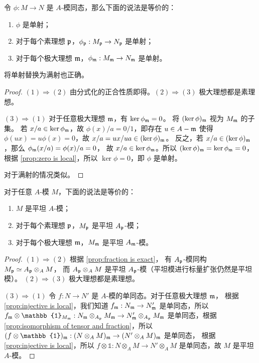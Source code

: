 \begin{proposition}\label{prop:injective is local}
  令 $\phi:M\to N$ 是 $A$-模同态，那么下面的说法是等价的：
  \begin{enumerate}
    \item $\phi$ 是单射；
    \item 对于每个素理想 $\mathfrak{p}$，$\phi_{\mathfrak{p}}:M_{\mathfrak{p}}\to N_{\mathfrak{p}}$ 是单射；
    \item 对于每个极大理想 $\mathfrak{m}$，$\phi_{\mathfrak{m}}:M_{\mathfrak{m}}\to N_{\mathfrak{m}}$ 是单射。
  \end{enumerate}
  将单射替换为满射也正确。
\end{proposition}
\begin{proof}
  $(1)\Rightarrow (2)$ 由分式化的正合性质即得。$(2)\Rightarrow (3)$
  极大理想都是素理想。

  $(3)\Rightarrow (1)$ 对于任意极大理想 $\mathfrak{m}$，有 $\ker\phi_{\mathfrak{m}}=0$。
  将 $(\ker\phi)_{\mathfrak{m}}$ 视为 $M_{\mathfrak{m}}$ 的子集。
  若 $x/a\in \ker\phi_{\mathfrak{m}}$，故 $\phi(x)/a=0/1$，即存在 $u\in A-\mathfrak{m}$
  使得 $\phi(ux)=u\phi(x)=0$，故 $x/a=ux/ua\in (\ker\phi)_{\mathfrak{m}}$。
  反之，若 $x/a\in(\ker\phi)_{\mathfrak{m}}$，那么 $\phi_{\mathfrak{m}}(x/a)=\phi(x)/a=0$，
  故 $x/a\in \ker\phi_{\mathfrak{m}}$。所以 $(\ker\phi)_{\mathfrak{m}}=\ker\phi_{\mathfrak{m}}=0$，
  根据 \autoref{prop:zero is local}，所以 $\ker\phi=0$，即 $\phi$ 是单射。

  对于满射的情况类似。
\end{proof}

\begin{proposition}[平坦性是局部性质]
  对于任意 $A$-模 $M$，下面的说法是等价的：
  \begin{enumerate}
    \item $M$ 是平坦 $A$-模；
    \item 对于每个素理想 $\mathfrak{p}$，$M_{\mathfrak{p}}$ 是平坦 $A_{\mathfrak{p}}$-模；
    \item 对于每个极大理想 $\mathfrak{m}$，$M_{\mathfrak{m}}$ 是平坦 $A_{\mathfrak{m}}$-模。
  \end{enumerate}
\end{proposition}
\begin{proof}
  $(1)\Rightarrow (2)$ 根据 \autoref{prop:fraction is exact}，
  有 $A_{\mathfrak{p}}$-模同构 $M_{\mathfrak{p}}\simeq A_{\mathfrak{p}}\otimes_AM$，
  而 $A_{\mathfrak{p}}\otimes_AM$ 是平坦 $A_{\mathfrak{p}}$-模（平坦模进行标量扩张仍然是平坦模）。
  $(2)\Rightarrow (3)$ 极大理想都是素理想。

  $(3)\Rightarrow (1)$ 令 $f:N\to N'$ 是 $A$-模的单同态。对于任意极大理想 $\mathfrak{m}$，
  根据 \autoref{prop:injective is local}，我们知道 $f_{\mathfrak{m}}:N_{\mathfrak{m}}\to N'_{\mathfrak{m}}$
  是单同态，所以 $f_{\ideal m}\otimes\mathbb{1}_{M_{\ideal m}}:
  N_{\ideal m}\otimes_{A_{\ideal p}}M_{\ideal m}\to N'_{\ideal m}\otimes_{A_{\ideal p}}M_{\ideal m}$
  是单同态，根据 \autoref{prop:isomorphism of tensor and fraction}，所以
  $(f\otimes\mathbb{1})_{\ideal m}:(N\otimes_AM)_{\ideal m}\to (N'\otimes_AM)_{\ideal m}$ 是单同态，
  根据 \autoref{prop:injective is local}，所以 $f\otimes\mathbb{1}:N\otimes_AM\to N'\otimes_AM$
  是单同态，故 $M$ 是平坦 $A$-模。
\end{proof}

